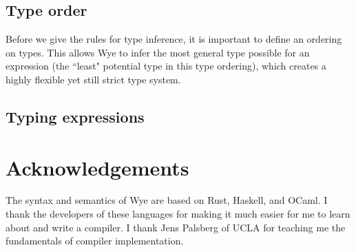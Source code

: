 \documentclass[a4paper, 12pt]{article}
\begin{document}
\subsection{Type order}

Before we give the rules for type inference, it is important to define an ordering on types. This allows Wye to infer the most general type possible for an expression (the ``least" potential type in this type ordering), which creates a highly flexible yet still strict type system.

\subsection{Typing expressions}




\pagebreak
\section{Acknowledgements}
The syntax and semantics of Wye are based on Rust, Haskell, and OCaml. I thank the developers of these languages for making it much easier for me to learn about and write a compiler. I thank Jens Palsberg of UCLA for teaching me the fundamentals of compiler implementation.

\pagebreak



\end{document}
